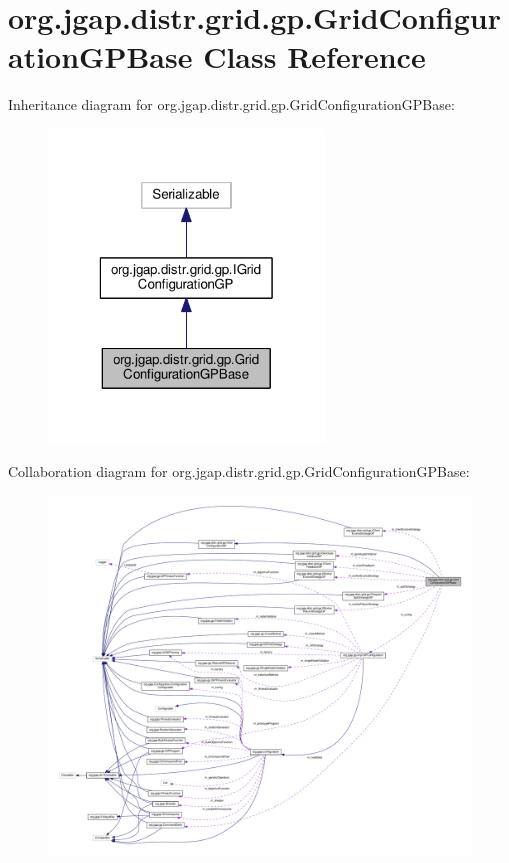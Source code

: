 \hypertarget{classorg_1_1jgap_1_1distr_1_1grid_1_1gp_1_1_grid_configuration_g_p_base}{\section{org.\-jgap.\-distr.\-grid.\-gp.\-Grid\-Configuration\-G\-P\-Base Class Reference}
\label{classorg_1_1jgap_1_1distr_1_1grid_1_1gp_1_1_grid_configuration_g_p_base}
}


Inheritance diagram for org.\-jgap.\-distr.\-grid.\-gp.\-Grid\-Configuration\-G\-P\-Base\-:
\nopagebreak
\begin{figure}[H]
\begin{center}
\leavevmode
\includegraphics[width=208pt]{classorg_1_1jgap_1_1distr_1_1grid_1_1gp_1_1_grid_configuration_g_p_base__inherit__graph}
\end{center}
\end{figure}


Collaboration diagram for org.\-jgap.\-distr.\-grid.\-gp.\-Grid\-Configuration\-G\-P\-Base\-:
\nopagebreak
\begin{figure}[H]
\begin{center}
\leavevmode
\includegraphics[width=350pt]{classorg_1_1jgap_1_1distr_1_1grid_1_1gp_1_1_grid_configuration_g_p_base__coll__graph}
\end{center}
\end{figure}
